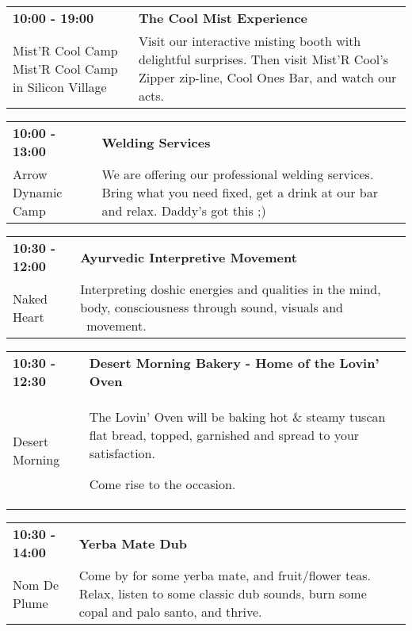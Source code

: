 \begin{tabular}{ p{1in} p{2.2in} }
    \textbf{10:00 - 19:00} & \textbf{The Cool Mist Experience} \\
    Mist'R Cool Camp \newline Mist'R Cool Camp in Silicon Village & Visit our interactive misting booth with delightful surprises. Then visit Mist'R Cool's Zipper zip-line, Cool Ones Bar, and watch our acts. \\
    \hline 
\end{tabular}
    
\begin{tabular}{ p{1in} p{2.2in} }
    \textbf{10:00 - 13:00} & \textbf{Welding Services} \\
    Arrow Dynamic Camp \newline  & We are offering our professional welding services.  Bring what you need fixed, get a drink at our bar and relax. Daddy's got this ;) \\
    \hline 
\end{tabular}
    
\begin{tabular}{ p{1in} p{2.2in} }
    \textbf{10:30 - 12:00} & \textbf{Ayurvedic Interpretive Movement} \\
    Naked Heart \newline  & Interpreting doshic energies and qualities in the mind, body, consciousness through sound, visuals and ~movement. \\
    \hline 
\end{tabular}
    
\begin{tabular}{ p{1in} p{2.2in} }
    \textbf{10:30 - 12:30} & \textbf{Desert Morning Bakery - Home of the Lovin' Oven} \\
    Desert Morning \newline  & The Lovin' Oven will be baking hot \& steamy tuscan flat bread, topped, garnished and spread to your satisfaction.

Come rise to the occasion. \\
    \hline 
\end{tabular}
    
\begin{tabular}{ p{1in} p{2.2in} }
    \textbf{10:30 - 14:00} & \textbf{Yerba Mate Dub} \\
    Nom De Plume \newline  & Come by for some yerba mate, and fruit/flower teas. Relax, listen to some classic dub sounds, burn some copal and palo santo, and thrive. \\
    \hline 
\end{tabular}
    
